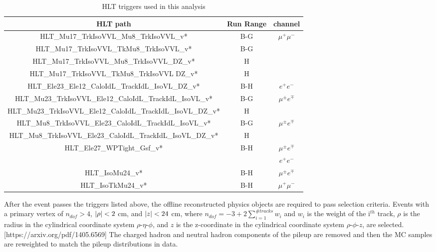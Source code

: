 \begin{table}
\begin{center}
\small
\caption{HLT triggers used in this analysis}
\label{tab:triggerlist}
 \begin{tabular}{ |c |c|c|}
  \hline 
HLT path & Run Range & channel\\\hline
HLT\_Mu17\_TrkIsoVVL\_Mu8\_TrkIsoVVL\_v*&B-G&  $\mu^{+}\mu^{-}$ \\
HLT\_Mu17\_TrkIsoVVL\_TkMu8\_TrkIsoVVL\_v*& B-G &\\
HLT\_Mu17\_TrkIsoVVL\_Mu8\_TrkIsoVVL\_DZ\_v* &H &\\
HLT\_Mu17\_TrkIsoVVL\_TkMu8\_TrkIsoVVL DZ\_v* &H &\\\hline


HLT\_Ele23\_Ele12\_CaloIdL\_TrackIdL\_IsoVL\_DZ\_v* &B-H&$e^{+}e^{-}$\\\hline
HLT\_Mu23\_TrkIsoVVL\_Ele12\_CaloIdL\_TrackIdL\_IsoVL\_v*&B-G &  $\mu^{\pm}e^{\mp}$ \\
HLT\_Mu23\_TrkIsoVVL\_Ele12\_CaloIdL\_TrackIdL\_IsoVL\_DZ\_v*&H&\\\hline

HLT\_Mu8\_TrkIsoVVL\_Ele23\_CaloIdL\_TrackIdL\_IsoVL\_v*&B-G&$\mu^{\pm}e^{\mp}$\\
HLT\_Mu8\_TrkIsoVVL\_Ele23\_CaloIdL\_TrackIdL\_IsoVL\_DZ\_v*&H&\\\hline

HLT\_Ele27\_WPTight\_Gsf\_v*&B-H& $\mu^{\pm}e^{\mp}$\\
&& $e^{+}e^{-}$\\\hline

HLT\_IsoMu24\_v*&B-H&$\mu^{\pm}e^{\mp}$\\
HLT\_IsoTkMu24\_v*&B-H&$\mu^{+}\mu^{-}$\\\hline

\end{tabular}
\end{center}
\end{table}

After the event passes the triggers listed above, the offline reconstructed physics objects are required to pass selection criteria. Events with a primary vertex of $n_{dof} > 4$, $\left\vert\rho\right\vert< 2$ cm, and $\left\vert z\right\vert < 24$ cm, where $n_{dof} = -3 + 2\sum_{i=1}^{\# tracks} w_i$ and $w_i$ is the weight of the i$^{th}$ track, $\rho$ is the radius in the cylindrical coordinate system $\rho$-$\eta$-$\phi$, and $z$ is the z-coordinate in the cylindrical coordinate system $\rho$-$\phi$-$z$, are selected. [https://arxiv.org/pdf/1405.6569] The charged hadron and neutral hadron components of the pileup are removed and then the MC samples are reweighted to match the pileup distributions in data. 


